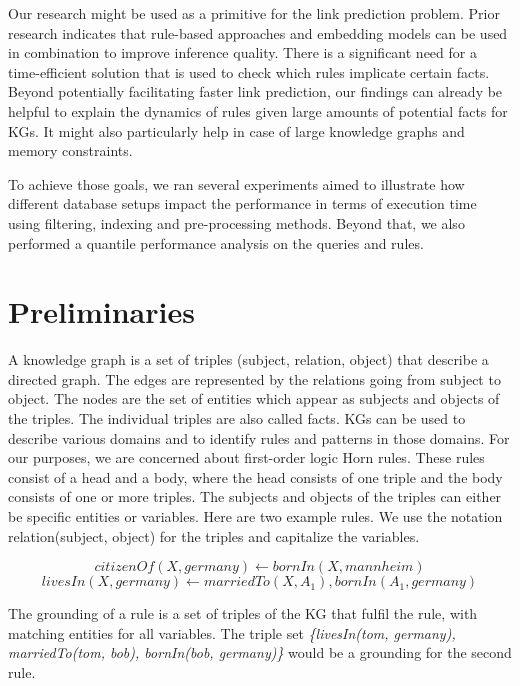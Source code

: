 \documentclass[english]{lni}
\begin{document}
Our research might be used as a primitive for the link prediction problem. Prior research indicates that rule-based approaches and embedding models can be used in combination to improve inference quality.\cite{RuleEmbeddingCombination1}\cite{RuleEmbeddingCombination2} There is a significant need for a time-efficient solution that is used to check which rules implicate certain facts. Beyond potentially facilitating faster link prediction, our findings can already be helpful to explain the dynamics of rules given large amounts of potential facts for KGs. It might also particularly help in case of large knowledge graphs and memory constraints. 

To achieve those goals, we ran several experiments aimed to illustrate how different database setups impact the performance in terms of execution time using filtering, indexing and pre-processing methods. Beyond that, we also performed a quantile performance analysis on the queries and rules.

\section{Preliminaries} 
A knowledge graph is a set of triples (subject, relation, object) that describe a directed graph. The edges are represented by the relations going from subject to object. The nodes are the set of entities which appear as subjects and objects of the triples. The individual triples are also called facts. KGs can be used to describe various domains and to identify rules and patterns in those domains. For our purposes, we are concerned about first-order logic Horn rules. These rules consist of a head and a body, where the head consists of one triple and the body consists of one or more triples. The subjects and objects of the triples can either be specific entities or variables. Here are two example rules. We use the notation relation(subject, object) for the triples and capitalize the variables.

\begin{equation}
citizenOf(X, germany) \leftarrow bornIn(X, mannheim) 
\end{equation}
\begin{equation}
livesIn(X, germany) \leftarrow marriedTo(X, A_1), bornIn(A_1, germany)
\end{equation}

The grounding of a rule is a set of triples of the KG that fulfil the rule, with matching entities for all variables. The triple set \textit{\{livesIn(tom, germany), marriedTo(tom, bob), bornIn(bob, germany)\}} would be a grounding for the second rule.
\end{document}
